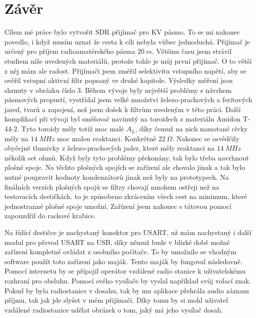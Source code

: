 \section*{Závěr}
\indent\indent Cílem mé práce bylo vytvořit SDR přijímač pro KV pásmo. To se mi nakonec povedlo, i když musím uznat že cesta k cíli nebyla vůbec jednoduchá. Přijímač je určený pro příjem radioamatérského pásma $20~m$. Většinu času jsem strávil studiem níže uvedených materiálů, protože tohle je můj první přijímač. O to větší z něj mám ale radost. Přijímači jsem změřil selektivitu vstupního napětí, aby se ověřil vstupní aktivní filtr popsaný ve druhé kapitole. Výsledky měření jsou shrnuty v obrázku číslo 3. Během vývoje byly největší problémy s návrhem pásmových propustí, vystřídal jsem velké množství železo-prachových a feritových jared, tvarů a zapojení, než jsem došek k filtrům uvedeným v této práci. Další komplikací při vývoji byl směšovač navinutý na toroidech z materiálu Amidon T-44-2. Tyto toroidy měly totiž moc malé $A_L$, díky čemuž na nich namotané cívky měly na $14~MHz$ moc malou reaktanci. Konkrétně $22~\Omega$. Nakonec se osvědčily obyčejné tlumivky z železo-prachových jader, které měly reaktanci na $14~MHz$ několik set ohmů. Když byly tyto problémy překonány, tak bylo třeba navrhnout plošné spoje. Na těchto plošných spojích se zařízení ale chovalo jinak a tak bylo nutné poupravit hodnoty kondenzátorů jinak než byly na prototypech. Na finálních verzích plošných spojů se filtry chovají mnohem ostřeji než na testovacích destičkách. to je způsobeno zkrácením všech cest na minimum, které jednostranné plošné spoje umožní. Zařízení jsem nakonec s tátovou pomocí zapouzdřil do rackové krabice.

Na řídící destičce je nachystaný konektor pro USART, už mám nachystaný i další modul pro převod USART na USB, díky němuž bude v blízké době možné zařízení kompletně ovládat z osobního počítače. To by umožnilo se vhodným software použít toto zařízení jako maják. Tento maják by fungoval následovně. Pomocí internetu by se připojil operátor vzdálené radio stanice k uživatelskému rozhraní pro obsluhu. Pomocí svého vysílače by vyslal například svůj volací znak. Pokud by byla radiostanice v dosahu, tak by mu aplikace přehrála audio záznam příjmu, tak jak jde slyšet v mém přijímači. Díky tomu by si mohl uživatel vzdálené radiostanice udělat obrázek o tom, jaký má jeho vysílač dosah.